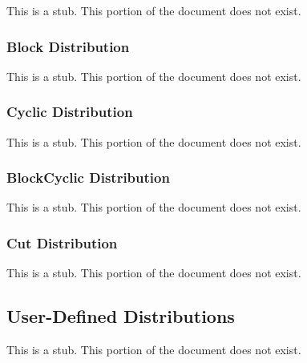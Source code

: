 This is a stub.  This portion of the document does not exist.

\subsubsection{Block Distribution}
\label{Block_Distribution}

This is a stub.  This portion of the document does not exist.

\subsubsection{Cyclic Distribution}
\label{Cyclic_Distribution}

This is a stub.  This portion of the document does not exist.

\subsubsection{BlockCyclic Distribution}
\label{BlockCyclic_Distribution}

This is a stub.  This portion of the document does not exist.

\subsubsection{Cut Distribution}
\label{Cut_Distribution}

This is a stub.  This portion of the document does not exist.

\subsection{User-Defined Distributions}
\label{User-Defined_Distributions}

This is a stub.  This portion of the document does not exist.
